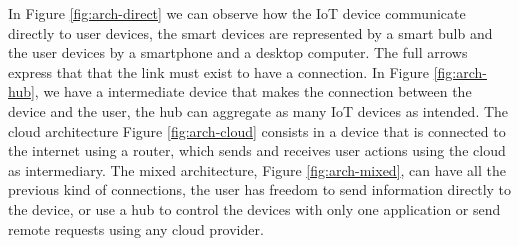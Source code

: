 In Figure \ref{fig:arch-direct} we can observe how the IoT device communicate directly to user devices, the smart devices are represented by a smart bulb and the user devices by a smartphone and a desktop computer. The full arrows express that that the link must exist to have a connection. In Figure \ref{fig:arch-hub}, we have a intermediate device that makes the connection between the device and the user, the hub can aggregate as many IoT devices as intended. The cloud architecture Figure \ref{fig:arch-cloud} consists in a device that is connected to the internet using a router, which sends and receives user actions using the cloud as intermediary. The mixed architecture, Figure \ref{fig:arch-mixed}, can have all the previous kind of connections, the user has freedom to send information directly to the device, or use a hub to control the devices with only one application or send remote requests using any cloud provider.

